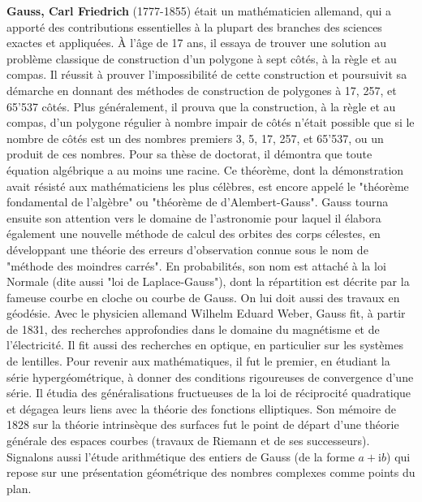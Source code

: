 \textbf{Gauss, Carl Friedrich} (1777-1855) était un mathématicien allemand, qui a apporté des contributions essentielles à la plupart des branches des sciences exactes et appliquées. À l'âge de 17 ans, il essaya de trouver une solution au problème classique de construction d'un polygone à sept côtés, à la règle et au compas. Il réussit à prouver l'impossibilité de cette construction et poursuivit sa démarche en donnant des méthodes de construction de polygones à 17, 257, et 65'537 côtés. Plus généralement, il prouva que la construction, à la règle et au compas, d'un polygone régulier à nombre impair de côtés n'était possible que si le nombre de côtés est un des nombres premiers 3, 5, 17, 257, et 65'537, ou un produit de ces nombres. Pour sa thèse de doctorat, il démontra que toute équation algébrique a au moins une racine. Ce théorème, dont la démonstration avait résisté aux mathématiciens les plus célèbres, est encore appelé le "théorème fondamental de l'algèbre" ou "théorème de d'Alembert-Gauss". Gauss tourna ensuite son attention vers le domaine de l'astronomie pour laquel il élabora également une nouvelle méthode de calcul des orbites des corps célestes, en développant une théorie des erreurs d'observation connue sous le nom de "méthode des moindres carrés". En probabilités, son nom est attaché à la loi Normale (dite aussi "loi de Laplace-Gauss"), dont la répartition est décrite par la fameuse courbe en cloche ou courbe de Gauss. On lui doit aussi des travaux en géodésie. Avec le physicien allemand Wilhelm Eduard Weber, Gauss fit, à partir de 1831, des recherches approfondies dans le domaine du magnétisme et de l'électricité. Il fit aussi des recherches en optique, en particulier sur les systèmes de lentilles. Pour revenir aux mathématiques, il fut le premier, en étudiant la série hypergéométrique, à donner des conditions rigoureuses de convergence d'une série. Il étudia des généralisations fructueuses de la loi de réciprocité quadratique et dégagea leurs liens avec la théorie des fonctions elliptiques. Son mémoire de 1828 sur la théorie intrinsèque des surfaces fut le point de départ d'une théorie générale des espaces courbes (travaux de Riemann et de ses successeurs). Signalons aussi l'étude arithmétique des entiers de Gauss (de la forme $a+\mathrm{i}b$) qui repose sur une présentation géométrique des nombres complexes comme points du plan.

